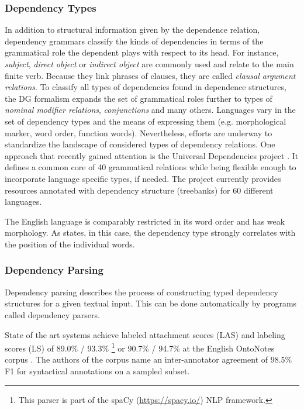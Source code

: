 \subsubsection{Dependency Types} \label{subsec:dependency_types}
In addition to structural information given by the dependence relation, dependency grammars classify the kinds of dependencies in terms of the grammatical role the dependent plays with respect to its head. For instance, \textit{subject}, \textit{direct object} or \textit{indirect object} are commonly used and relate to the main finite verb. Because they link phrases of clauses, they are called \textit{clausal argument relations}. To classify all types of dependencies found in dependence structures, the \ac{DG} formalism expands the set of grammatical roles further to types of \textit{nominal modifier relations}, \textit{conjunctions} and many others. Languages vary in the set of dependency types and the means of expressing them (e.g. morphological marker, word order, function words). Nevertheless, efforts are underway to standardize the landscape of considered types of dependency relations. One approach that recently gained attention is the Universal Dependencies project \autocite{nivre_universal_2016}. It defines a common core of 40 grammatical relations while being flexible enough to incorporate language specific types, if needed. The project currently provides resources annotated with dependency structure (treebanks) for 60 different languages.

The English language is comparably restricted in its word order and has weak morphology. As \textcite{jurafsky_dependency_2014} states, in this case, the dependency type strongly correlates with the position of the individual words.


\subsubsection{Dependency Parsing} \label{subsubsec:dependency_parsing}
Dependency parsing describes the process of constructing typed dependency structures for a given textual input. This can be done automatically by programs called dependency parsers.

State of the art systems achieve labeled attachment scores (LAS) and labeling scores (LS) of 89.0\% / 93.3\% \autocite{honnibal_improved_2015}\footnote{This parser is part of the spaCy (\url{https://spacy.io/}) \ac{NLP} framework.} or 90.7\% / 94.7\% \autocite{choi_it_2015} at the English OntoNotes corpus \autocite{weischedel_ontonotes_2011}. The authors of the corpus name an inter-annotator agreement of 98.5\% F1 for syntactical annotations on a sampled subset.

